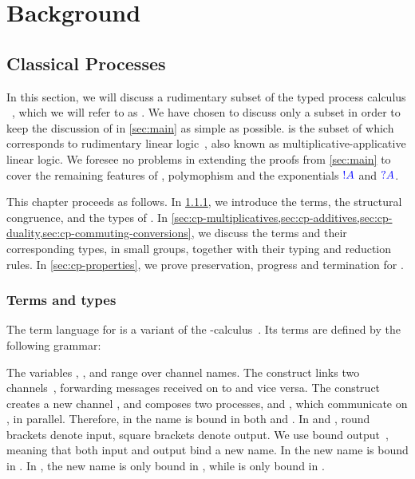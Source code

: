 \chapter{Background}
\label{sec:background}

\section{Classical Processes}
\label{sec:cp}
In this section, we will discuss a rudimentary subset of the typed process
calculus \cp~\parencite{wadler2012,lindley2015semantics}, which we will refer to as
\rcp. 
We have chosen to discuss only a subset in order to keep the discussion of
\nodcap in \cref{sec:main} as simple as possible.
\rcp is the subset of \cp which corresponds to rudimentary linear
logic~\parencite[RLL]{girard1992}, also known as multiplicative-applicative linear
logic. 
We foresee no problems in extending the proofs from \cref{sec:main} to
cover the remaining features of \cp, polymophism and the exponentials $\textcolor{blue}{!A}$
and $\textcolor{blue}{?A}$. 

This chapter proceeds as follows.
In \cref{sec:cp-terms-and-types}, we introduce the terms, the structural
congruence, and the types of \rcp. 
In \cref{sec:cp-multiplicatives,sec:cp-additives,sec:cp-duality,sec:cp-commuting-conversions}, 
we discuss the terms and their corresponding types, in small groups,
together with their typing and reduction rules.
In \cref{sec:cp-properties}, we prove preservation, progress and
termination for \rcp.

\subsection{Terms and types}
\label{sec:cp-terms-and-types}
The term language for \rcp is a variant of the
\textpi-calculus~\parencite{milner1992b}.
Its terms are defined by the following grammar:

The variables , ,  and  range over channel names.
The construct  links two
channels~\parencite{sangiorgi1996,boreale1998}, forwarding messages received on
 to  and vice versa.
The construct  creates a new channel , and composes
two processes,  and , which communicate on , in parallel.
Therefore, in  the name  is bound in both  and
.
In  and , round brackets denote
input, square brackets denote output. 
We use bound output~\parencite{sangiorgi1996}, meaning that both input and output
bind a new name. 
In  the new name  is bound in .
In , the new name  is only bound in , while
 is only bound in .

